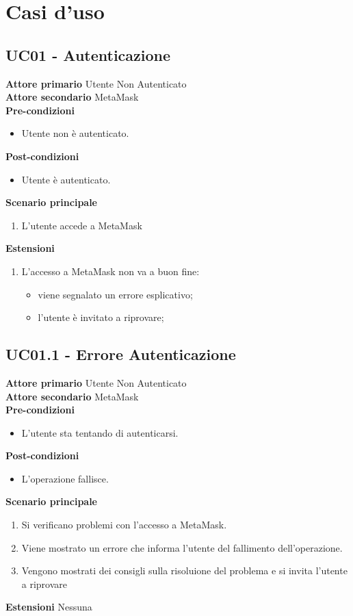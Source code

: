 \section{Casi d'uso}

\subsection{UC01 - Autenticazione}
\textbf{Attore primario} Utente Non Autenticato \\
\textbf{Attore secondario} MetaMask \\
\textbf{Pre-condizioni}
\begin{itemize}
    \item Utente non è autenticato.
\end{itemize}
\textbf{Post-condizioni}
\begin{itemize}
    \item Utente è autenticato.
\end{itemize}
\textbf{Scenario principale}
\begin{enumerate}
    \item L'utente accede a MetaMask
\end{enumerate}
\textbf{Estensioni}
\begin{enumerate}
    \item L'accesso a MetaMask non va a buon fine:
    \begin{itemize}
        \item viene segnalato un errore esplicativo;
        \item l'utente è invitato a riprovare;
    \end{itemize}
\end{enumerate}

\subsection{UC01.1 - Errore Autenticazione}
\textbf{Attore primario} Utente Non Autenticato \\
\textbf{Attore secondario} MetaMask \\
\textbf{Pre-condizioni}
\begin{itemize}
    \item L'utente sta tentando di autenticarsi.
\end{itemize}
\textbf{Post-condizioni}
\begin{itemize}
    \item L'operazione fallisce.
\end{itemize}
\textbf{Scenario principale}
\begin{enumerate}
    \item Si verificano problemi con l'accesso a MetaMask.
    \item Viene mostrato un errore che informa l'utente del fallimento dell'operazione.
    \item Vengono mostrati dei consigli sulla risoluione del problema e si invita l'utente a riprovare
\end{enumerate}
\textbf{Estensioni} Nessuna

